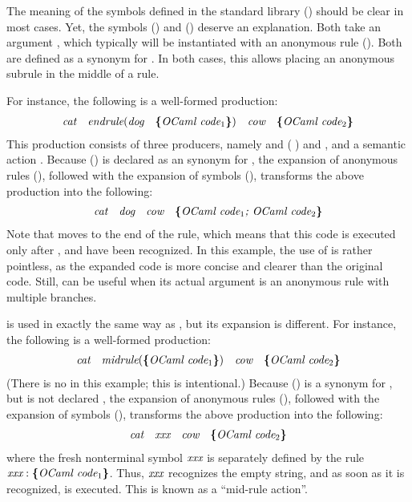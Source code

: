 \documentclass[onecolumn,11pt,nocopyrightspace,preprint]{sigplanconf}
\begin{document}
The meaning of the symbols defined in the standard library
() should be clear in most cases. Yet, the
symbols () and () deserve an explanation.
Both take an argument , which typically will be instantiated with an
anonymous rule (). Both are defined as a synonym
for . In both cases, this allows placing an anonymous subrule in the
middle of a rule.

\newcommand{\AAA}{\nt{cat}}
\newcommand{\BBB}{\nt{dog}}
\newcommand{\CCC}{\nt{cow}}
\newcommand{\XXX}{\nt{xxx}}

For instance, the following is a well-formed production:
%
\[\begin{array}{l}
  \AAA \quad
  \nt{endrule}(\BBB \quad \dpaction{\nt{\ocaml code$_1$}}) \quad
  \CCC \quad
  \dpaction{\nt{\ocaml code$_2$}}
\end{array}\]
%
This production consists of three producers, namely
\AAA{} and
(\BBB$\;$) and
\CCC,
and a semantic action .
%
Because () is declared as an \dinline synonym for ,
the expansion of anonymous rules (), followed with the
expansion of \dinline symbols (), transforms the above
production into the following:
%
\[\begin{array}{l}
  \AAA \quad
  \BBB \quad
  \CCC \quad
  \dpaction{\nt{\ocaml code$_1$; \ocaml code$_2$}}
\end{array}\]
%
Note that  moves to the end of the rule, which means that
this code is executed only after \AAA, \BBB{} and \CCC{} have
been recognized. In this example, the use of  is rather pointless,
as the expanded code is more concise and clearer than the original code. Still,
 can be useful when its actual argument is an anonymous rule with
multiple branches.


 is used in exactly the same way as , but its expansion
is different. For instance, the following is a well-formed production:
%
\[\begin{array}{l}
  \AAA \quad
  \nt{midrule}(\dpaction{\nt{\ocaml code$_1$}}) \quad
  \CCC \quad
  \dpaction{\nt{\ocaml code$_2$}}
\end{array}\]
%
(There is no \BBB{} in this example; this is intentional.)
Because () is a synonym for , but is not declared
\dinline, the expansion of anonymous rules (), followed
with the expansion of \dinline symbols (), transforms the
above production into the following:
%
\[\begin{array}{l}
  \AAA \quad
  \XXX \quad
  \CCC \quad
  \dpaction{\nt{\ocaml code$_2$}}
\end{array}\]
%
where the fresh nonterminal symbol $\XXX$ is separately defined by the
rule $\XXX: \dpaction{\nt{\ocaml code$_1$}}$. Thus, $\XXX$ recognizes
the empty string, and as soon as it is recognized, 
is executed. This is known as a ``mid-rule action''.
\end{document}
